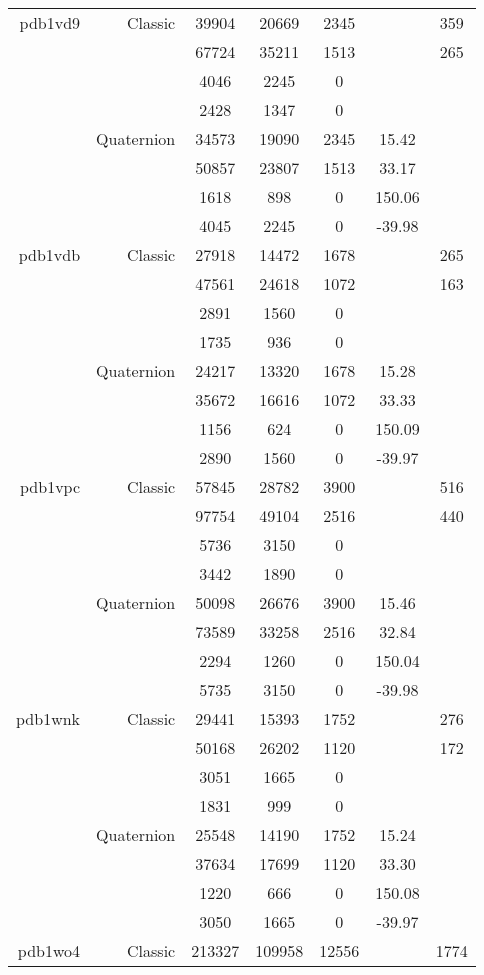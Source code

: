 \begin{xltabular}{\textwidth}{r|rcccSc}
pdb1vd9 & Classic & 39904 & 20669 & 2345 & & 359 \\
& & 67724 & 35211 & 1513 & & 265 \\
& & 4046 & 2245 & 0 & & \\
& & 2428 & 1347 & 0 & & \\
& Quaternion & 34573 & 19090 & 2345 & 15.42 & \\
& & 50857 & 23807 & 1513 & 33.17 & \\
& & 1618 & 898 & 0 & 150.06 & \\
& & 4045 & 2245 & 0 & -39.98 & \\ \addlinespace
pdb1vdb & Classic & 27918 & 14472 & 1678 & & 265 \\
& & 47561 & 24618 & 1072 & & 163 \\
& & 2891 & 1560 & 0 & & \\
& & 1735 & 936 & 0 & & \\
& Quaternion & 24217 & 13320 & 1678 & 15.28 & \\
& & 35672 & 16616 & 1072 & 33.33 & \\
& & 1156 & 624 & 0 & 150.09 & \\
& & 2890 & 1560 & 0 & -39.97 & \\ \addlinespace
pdb1vpc & Classic & 57845 & 28782 & 3900 & & 516 \\
& & 97754 & 49104 & 2516 & & 440 \\
& & 5736 & 3150 & 0 & & \\
& & 3442 & 1890 & 0 & & \\
& Quaternion & 50098 & 26676 & 3900 & 15.46 & \\
& & 73589 & 33258 & 2516 & 32.84 & \\
& & 2294 & 1260 & 0 & 150.04 & \\
& & 5735 & 3150 & 0 & -39.98 & \\ \addlinespace
pdb1wnk & Classic & 29441 & 15393 & 1752 & & 276 \\
& & 50168 & 26202 & 1120 & & 172 \\
& & 3051 & 1665 & 0 & & \\
& & 1831 & 999 & 0 & & \\
& Quaternion & 25548 & 14190 & 1752 & 15.24 & \\
& & 37634 & 17699 & 1120 & 33.30 & \\
& & 1220 & 666 & 0 & 150.08 & \\
& & 3050 & 1665 & 0 & -39.97 & \\ \addlinespace
pdb1wo4 & Classic & 213327 & 109958 & 12556 & & 1774 \\

\end{xltabular}
